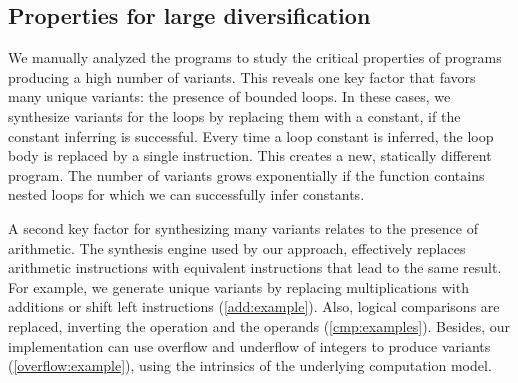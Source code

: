 

\subsection*{Properties for large diversification}

We manually analyzed the programs to study the critical properties of programs producing a high number of variants.
This reveals one key factor that favors many unique variants: the presence of bounded loops. In these cases, we synthesize variants for the loops by replacing them with a constant, if the constant inferring is successful. Every time a loop constant is inferred, the loop body is replaced by a single instruction. This creates a new, statically different program. The number of variants grows exponentially if the function contains nested loops for which we can successfully infer constants. 
 

A second key factor for synthesizing many variants relates to the presence of arithmetic. The synthesis engine used by our approach, effectively replaces arithmetic instructions with equivalent instructions that lead to the same result. For example, we generate unique variants by replacing multiplications with additions or shift left instructions (\autoref{add:example}). Also, logical comparisons are replaced, inverting the operation and the operands (\autoref{cmp:examples}). Besides, our implementation can use overflow and underflow of integers to produce variants (\autoref{overflow:example}), using the intrinsics of the underlying computation model.

